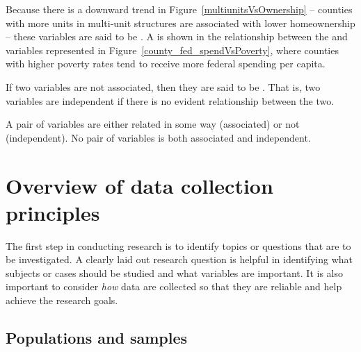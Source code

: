 Because there is a downward trend in Figure~\ref{multiunitsVsOwnership} -- counties with more units in multi-unit structures are associated with lower homeownership -- these variables are said to be . A  is shown in the relationship between the  and  variables represented in Figure~\ref{county_fed_spendVsPoverty}, where counties with higher poverty rates tend to receive more federal spending per capita.

If two variables are not associated, then they are said to be . That is, two variables are independent if there is no evident relationship between the two.

\begin{termBox}{
A pair of variables are either related in some way (associated) or not (independent). No pair of variables is both associated and independent.}
\end{termBox}


\section{Overview of data collection principles}
\label{overviewOfDataCollectionPrinciples}


The first step in conducting research is to identify topics or questions that are to be investigated. A clearly laid out research question is helpful in identifying what subjects or cases should be studied and what variables are important. It is also important to consider \emph{how} data are collected so that they are reliable and help achieve the research goals.

\subsection{Populations and samples}
\label{populationsAndSamples}

